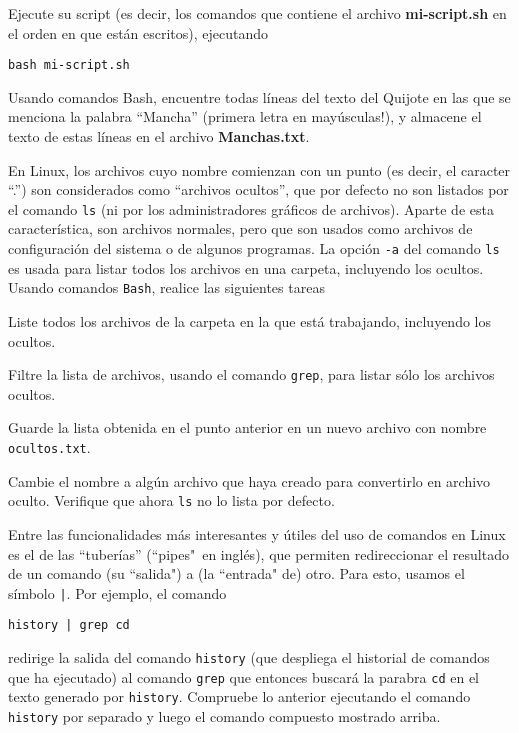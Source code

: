 \documentclass[11pt]{exam}
\begin{document}
\begin{questions}
\begin{parts}
\item Ejecute su script (es decir, los comandos que contiene el archivo \textbf{mi-script.sh} en el orden en que están escritos), ejecutando 

\begin{verbatim}
bash mi-script.sh
\end{verbatim}
\end{parts}


\item Usando comandos Bash, encuentre todas líneas del texto del Quijote en las que se menciona la palabra ``Mancha'' (primera letra en mayúsculas!), y almacene el texto de estas líneas en el archivo \textbf{Manchas.txt}.

\item En Linux, los archivos cuyo nombre comienzan con un punto (es decir, el caracter ``.'') son considerados como ``archivos ocultos'', que por defecto no son listados por el comando \texttt{ls} (ni por los administradores gráficos de archivos). Aparte de esta característica, son archivos normales, pero que son usados como archivos de configuración del sistema o de algunos programas. La opción \texttt{-a} del comando \texttt{ls} es usada para listar todos los archivos en una carpeta, incluyendo los ocultos. Usando comandos \texttt{Bash}, realice las siguientes tareas
\begin{parts}
\item Liste todos los archivos de la carpeta en la que está trabajando, incluyendo los ocultos.
\item Filtre la lista de archivos, usando el comando \texttt{grep}, para listar sólo los archivos ocultos.
\item Guarde la lista obtenida en el punto anterior en un nuevo archivo con nombre \texttt{ocultos.txt}.
\item Cambie el nombre a algún archivo que haya creado para convertirlo en archivo oculto. Verifique que ahora \texttt{ls} no lo lista por defecto.
\end{parts}

\item Entre las funcionalidades más interesantes y útiles del uso de comandos en Linux es el de las ``tuberías'' (``pipes"\ en inglés), que permiten redireccionar el resultado de un comando (su ``salida") a (la ``entrada" de) otro. Para esto, usamos el símbolo \texttt{|}. Por ejemplo, el comando
\begin{verbatim}
history | grep cd
\end{verbatim}
redirige la salida del comando \texttt{history} (que despliega el historial de comandos que ha ejecutado) al comando \texttt{grep} que entonces buscará la parabra \texttt{cd} en el texto generado por \texttt{history}. Compruebe lo anterior ejecutando el comando \texttt{history} por separado y luego el comando compuesto mostrado arriba.


\end{questions}
\end{document}
